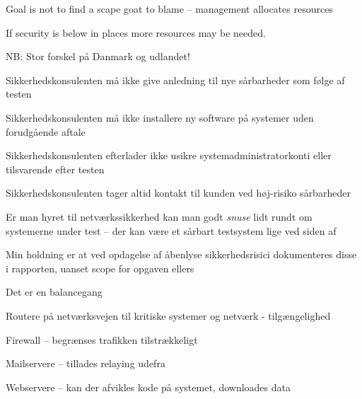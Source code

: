 \documentclass[Screen16to9,17pt]{foils}
\begin{document}
Goal is not to find a scape goat to blame -- management allocates resources

If security is below in places more resources may be needed.



\begin{list2}
\item NB: Stor forskel på Danmark og udlandet!
\item Sikkerhedskonsulenten må ikke give anledning til nye sårbarheder
  som følge af testen
\item Sikkerhedskonsulenten må ikke installere ny software på
  systemer uden forudgående aftale
\item Sikkerhedskonsulenten efterlader ikke usikre
  systemadministratorkonti eller tilsvarende efter testen
\item Sikkerhedskonsulenten tager altid kontakt til kunden ved
  høj-risiko sårbarheder
\item Er man hyret til netværkssikkerhed kan man godt \emph{snuse}
  lidt rundt om systemerne under test -- der kan være et sårbart
  testsystem lige ved siden af
\item Min holdning er at ved opdagelse af åbenlyse sikkerhedsrisici
  dokumenteres disse i rapporten, uanset scope for opgaven ellers
\end{list2}

\centerline{Det er en balancegang}




\begin{list2}
\item Routere på netværksvejen til kritiske systemer og netværk -
  tilgængelighed
\item Firewall -- begrænses trafikken tilstrækkeligt
\item Mailservere -- tillades relaying udefra
\item Webservere -- kan der afvikles kode på systemet, downloades data
\end{list2}





\end{document}

